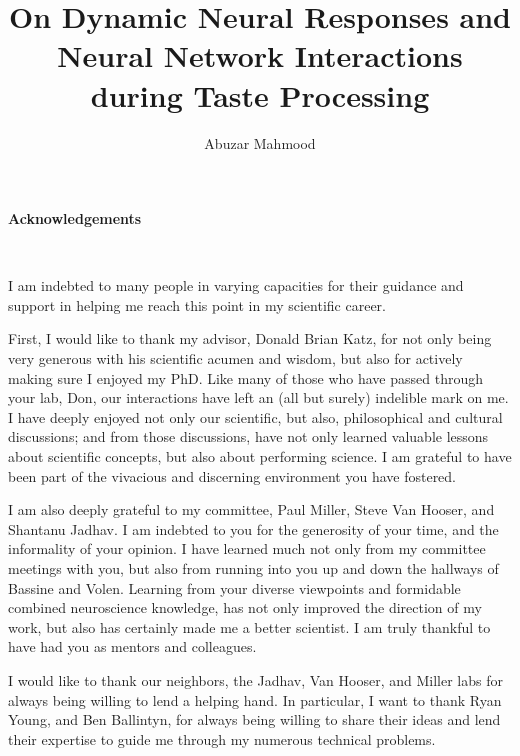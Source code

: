 \documentclass{brandeis-dissertation3.12}
\title{On Dynamic Neural Responses and Neural Network Interactions during Taste Processing}
\author{Abuzar Mahmood}
\begin{document}
\maketitlepage
\makeapproval

\newpage
\begin{center}
\mbox{}
\vfill
{}
\end{center}
\newpage

\newpage
\begin{center}
\textbf{Acknowledgements}
\end{center}
\\
\linespread{2}
\begin{doublespace}
I am indebted to many people in varying capacities for their guidance and support in helping me reach this point in my scientific career.

First, I would like to thank my advisor, Donald Brian Katz, for not only being very generous with his scientific acumen and wisdom, but also for actively making sure I enjoyed my PhD. Like many of those who have passed through your lab, Don, our interactions have left an (all but surely) indelible mark on me. I have deeply enjoyed not only our scientific, but also, philosophical and cultural discussions; and from those discussions, have not only learned valuable lessons about scientific concepts, but also about performing science. I am grateful to have been part of the vivacious and discerning environment you have fostered. 

I am also deeply grateful to my committee, Paul Miller, Steve Van Hooser, and Shantanu Jadhav. I am indebted to you for the generosity of your time, and the informality of your opinion. I have learned much not only from my committee meetings with you, but also from running into you up and down the hallways of Bassine and Volen. Learning from your diverse viewpoints and formidable combined neuroscience knowledge, has not only improved the direction of my work, but also has certainly made me a better scientist. I am truly thankful to have had you as mentors and colleagues.

I would like to thank our neighbors, the Jadhav, Van Hooser, and Miller labs for always being willing to lend a helping hand. In particular, I want to thank Ryan Young, and Ben Ballintyn, for always being willing to share their ideas and lend their expertise to guide me through my numerous technical problems.


\end{doublespace}
\end{document}
